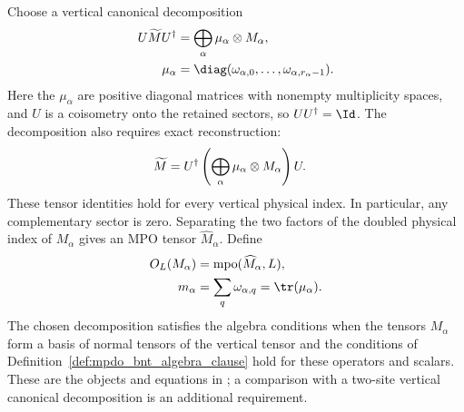 \begin{definition}%
    \label{def:mpdo_bnt_algebra_tensor_clause}
    \leanok
    Choose a vertical canonical decomposition
    \begin{align}
        U\widetilde M U^\dagger
         & =\bigoplus_\alpha \mu_\alpha\otimes M_\alpha,
        \notag                                                          \\
        \mu_\alpha
         & =\diag(\omega_{\alpha,0},\ldots,\omega_{\alpha,r_\alpha-1}).
        \notag
    \end{align}
    Here the $\mu_\alpha$ are positive diagonal matrices with nonempty
    multiplicity spaces, and $U$ is a coisometry onto the retained sectors,
    so $UU^\dagger=\Id$. The decomposition also requires exact
    reconstruction:
    \begin{align}
        \widetilde M
         & =U^\dagger
        \left(\bigoplus_\alpha\mu_\alpha\otimes M_\alpha\right)U.
        \notag
    \end{align}
    These tensor identities hold for every vertical physical index.
    In particular, any complementary sector is zero.
    Separating the two factors of the doubled physical index of
    $M_\alpha$ gives an MPO tensor $\widehat M_\alpha$. Define
    \begin{align}
        O_L(M_\alpha)
         & =\operatorname{mpo}(\widehat M_\alpha,L),
        \notag                                       \\
        m_\alpha
         & =\sum_q\omega_{\alpha,q}=\tr(\mu_\alpha).
        \notag
    \end{align}
    The chosen decomposition satisfies the algebra conditions when the
    tensors $M_\alpha$ form a basis of normal tensors of the vertical tensor and the conditions
    of Definition~\ref{def:mpdo_bnt_algebra_clause} hold for these operators
    and scalars. These are the objects and equations in
    \cite[Theorem~4.14(ii), lines~972--993, and Appendix~C.4,
        lines~2046--2064]{Cirac2016MPDO_arXiv}; a comparison with a two-site
    vertical canonical decomposition is an additional requirement.
\end{definition}

